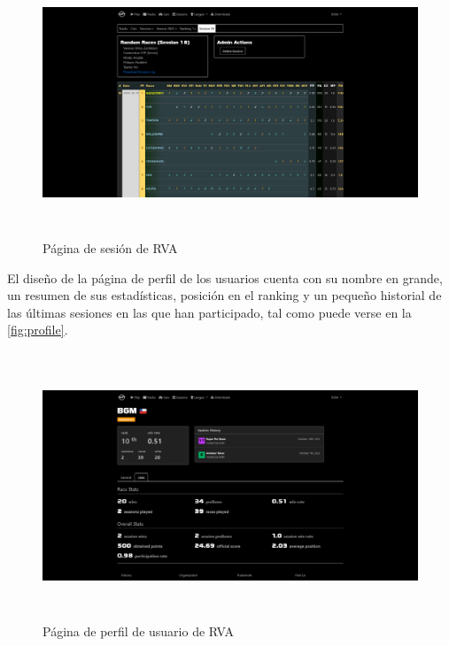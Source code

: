 \begin{figure}[H]
  \begin{center}
    \includegraphics[width=15cm, height=8cm]{img/session.png} 
  \end{center}
  \caption[Página de sesión de RVA]{Página de sesión de RVA}
  \label{fig:session}
\end{figure}

El diseño de la página de perfil de los usuarios cuenta con su nombre en grande, un resumen de sus estadísticas, posición en el ranking y un pequeño historial de las últimas sesiones en las que han participado, tal como puede verse en la \autoref{fig:profile}.

\begin{figure}[H]
  \begin{center}
    \includegraphics[width=15cm, height=8cm]{img/profile1.png} 
  \end{center}
  \caption[Página de perfil de usuario de RVA]{Página de perfil de usuario de RVA}
  \label{fig:profile}
\end{figure}

